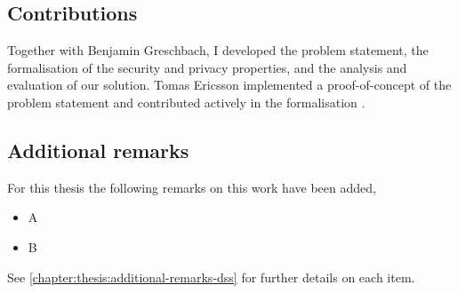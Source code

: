 \subsection{Contributions}
    \label{subsection:contributions-dss}
Together with Benjamin Greschbach, I developed the problem statement, the formalisation 
of the security and privacy properties, and the analysis and evaluation of our solution. 
Tomas Ericsson implemented a proof-of-concept of the problem statement and contributed 
actively in the formalisation \cite{Ericsson15}.

\subsection{Additional remarks}
    \label{subsection:additional-remarks-dss}
For this thesis the following remarks on this work have been added,
\begin{itemize}
    \item A
    \item B
\end{itemize}
See \cref{chapter:thesis:additional-remarks-dss} for further details on each item.

